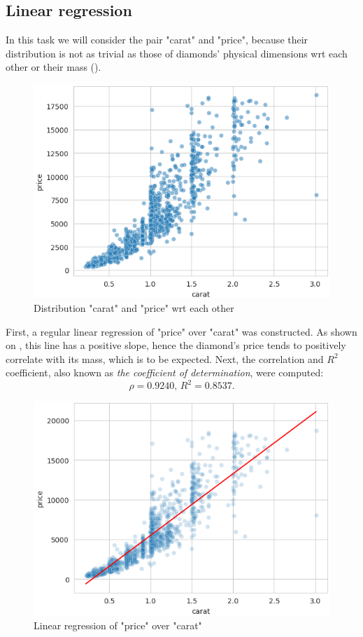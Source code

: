 \documentclass[12pt,a4paper]{article}
\begin{document}
	\newpage
	
	\subsection{Linear regression}
	
	In this task we will consider the pair "carat" and "price", because their distribution is not as trivial as those of diamonds' physical dimensions wrt each other or their mass ().
	
	\begin{figure}[h]
		\centering
		\includegraphics[width=.6\textwidth]{media/caratVprice.png}
		\caption{Distribution "carat" and "price" wrt each other}
		\label{fig:caratVprice}
	\end{figure}
	
	First, a regular linear regression of "price" over "carat" was constructed. As shown on , this line has a positive slope, hence the diamond's price tends to positively correlate with its mass, which is to be expected. Next, the correlation and $R^2$ coefficient, also known as \textit{the coefficient of determination}, were computed:
	\[\rho = 0.9240,\, R^2 = 0.8537.\]
	
	\begin{figure}[h]
		\centering
		\includegraphics[width=.6\textwidth]{media/caratVpriceReg.png}
		\caption{Linear regression of "price" over "carat"}
		\label{fig:caratVpriceReg}
	\end{figure}
	
\end{document}
